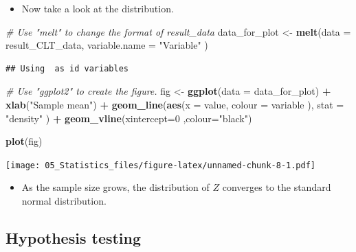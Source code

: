 \documentclass[]{book}
\newenvironment{Shaded}{\begin{snugshade}}{\end{snugshade}}
\newcommand{\KeywordTok}[1]{\textcolor[rgb]{0.13,0.29,0.53}{\textbf{#1}}}
\newcommand{\DataTypeTok}[1]{\textcolor[rgb]{0.13,0.29,0.53}{#1}}
\newcommand{\DecValTok}[1]{\textcolor[rgb]{0.00,0.00,0.81}{#1}}
\newcommand{\StringTok}[1]{\textcolor[rgb]{0.31,0.60,0.02}{#1}}
\newcommand{\CommentTok}[1]{\textcolor[rgb]{0.56,0.35,0.01}{\textit{#1}}}
\newcommand{\OperatorTok}[1]{\textcolor[rgb]{0.81,0.36,0.00}{\textbf{#1}}}
\newcommand{\NormalTok}[1]{#1}
\providecommand{\tightlist}{%
  \setlength{\itemsep}{0pt}\setlength{\parskip}{0pt}}
\begin{document}
\begin{itemize}
\tightlist
\item
  Now take a look at the distribution.
\end{itemize}

\begin{Shaded}
\begin{Highlighting}[]
\CommentTok{# Use "melt" to change the format of result_data}
\NormalTok{data_for_plot <-}\StringTok{ }\KeywordTok{melt}\NormalTok{(}\DataTypeTok{data =}\NormalTok{ result_CLT_data, }\DataTypeTok{variable.name =} \StringTok{"Variable"}\NormalTok{ )}
\end{Highlighting}
\end{Shaded}

\begin{verbatim}
## Using  as id variables
\end{verbatim}

\begin{Shaded}
\begin{Highlighting}[]
\CommentTok{# Use "ggplot2" to create the figure.}
\NormalTok{fig <-}\StringTok{ }
\StringTok{  }\KeywordTok{ggplot}\NormalTok{(}\DataTypeTok{data =}\NormalTok{ data_for_plot) }\OperatorTok{+}
\StringTok{  }\KeywordTok{xlab}\NormalTok{(}\StringTok{"Sample mean"}\NormalTok{) }\OperatorTok{+}\StringTok{ }
\StringTok{  }\KeywordTok{geom_line}\NormalTok{(}\KeywordTok{aes}\NormalTok{(}\DataTypeTok{x =}\NormalTok{ value, }\DataTypeTok{colour =}\NormalTok{ variable ),   }\DataTypeTok{stat =} \StringTok{"density"}\NormalTok{ ) }\OperatorTok{+}\StringTok{ }
\StringTok{  }\KeywordTok{geom_vline}\NormalTok{(}\DataTypeTok{xintercept=}\DecValTok{0}\NormalTok{ ,}\DataTypeTok{colour=}\StringTok{"black"}\NormalTok{)}

\KeywordTok{plot}\NormalTok{(fig)}
\end{Highlighting}
\end{Shaded}

\texttt{[image: 05\_Statistics\_files/figure-latex/unnamed-chunk-8-1.pdf]}

\begin{itemize}
\tightlist
\item
  As the sample size grows, the distribution of \(Z\) converges to the
  standard normal distribution.
\end{itemize}

\subsection{Hypothesis testing}\label{hypothesis-testing-1}
\end{document}
